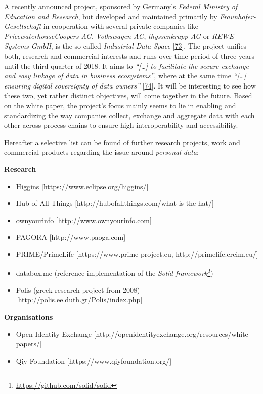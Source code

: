 \documentclass[12pt,english,a4paper,titlepage,cleardoublepage=empty,dottedtoc]{report}
\renewcommand{\href}[2]{#2\footnote{\url{#1}}}
\providecommand{\tightlist}{%
  \setlength{\itemsep}{0pt}\setlength{\parskip}{0pt}}
\begin{document}
A recently announced project, sponsored by Germany's \emph{Federal
Ministry of Education and Research}, but developed and maintained
primarily by \emph{Fraunhofer-Gesellschaft} in cooperation with several
private companies like \emph{PricewaterhouseCoopers AG},
\emph{Volkswagen AG}, \emph{thyssenkrupp AG} or \emph{REWE Systems
GmbH}, is the so called \emph{Industrial Data Space}
{[}\protect\hyperlink{ref-web_industrial-data-space}{73}{]}. The project
unifies both, research and commercial interests and runs over time
period of three years until the third quarter of 2018. It aims to
\emph{``{[}\ldots{}{]} to facilitate the secure exchange and easy
linkage of data in business ecosystems''}, where at the same time
\emph{``{[}\ldots{}{]} ensuring digital sovereignty of data owners''}
{[}\protect\hyperlink{ref-whitepaper_2016_industrial-data-space}{74}{]}.
It will be interesting to see how these two, yet rather distinct
objectives, will come together in the future. Based on the white paper,
the project's focus mainly seems to lie in enabling and standardizing
the way companies collect, exchange and aggregate data with each other
across process chains to ensure high interoperability and accessibility.

Hereafter a selective list can be found of further research projects,
work and commercial products regarding the issue around \emph{personal
data}:

\textbf{Research}

\begin{itemize}
\tightlist
\item
  Higgins {[}https://www.eclipse.org/higgins/{]}
\item
  Hub-of-All-Things {[}http://hubofallthings.com/what-is-the-hat/{]}
\item
  ownyourinfo {[}http://www.ownyourinfo.com{]}
\item
  PAGORA {[}http://www.paoga.com{]}
\item
  PRIME/PrimeLife {[}https://www.prime-project.eu,
  http://primelife.ercim.eu/{]}
\item
  databox.me (reference implementation of the
  \emph{\href{https://github.com/solid/solid}{Solid framework}})
\item
  Polis (greek research project from 2008)
  {[}http://polis.ee.duth.gr/Polis/index.php{]}
\end{itemize}

\textbf{Organisations}

\begin{itemize}
\tightlist
\item
  Open Identity Exchange
  {[}http://openidentityexchange.org/resources/white-papers/{]}
\item
  Qiy Foundation {[}https://www.qiyfoundation.org/{]}
\end{itemize}
\end{document}
